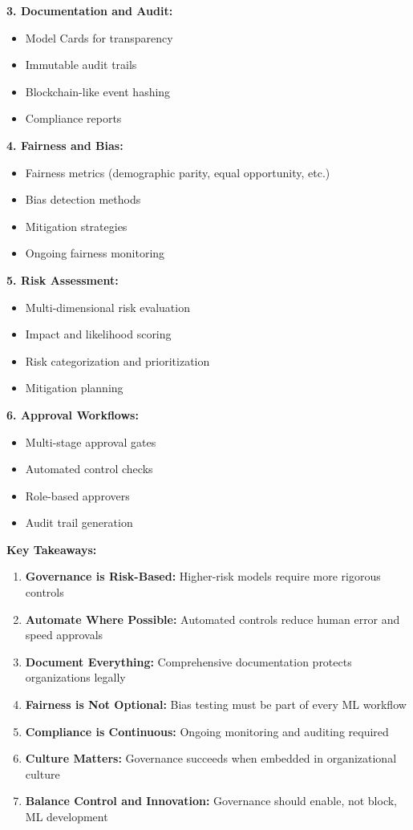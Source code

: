 \textbf{3. Documentation and Audit:}
\begin{itemize}
    \item Model Cards for transparency
    \item Immutable audit trails
    \item Blockchain-like event hashing
    \item Compliance reports
\end{itemize}

\textbf{4. Fairness and Bias:}
\begin{itemize}
    \item Fairness metrics (demographic parity, equal opportunity, etc.)
    \item Bias detection methods
    \item Mitigation strategies
    \item Ongoing fairness monitoring
\end{itemize}

\textbf{5. Risk Assessment:}
\begin{itemize}
    \item Multi-dimensional risk evaluation
    \item Impact and likelihood scoring
    \item Risk categorization and prioritization
    \item Mitigation planning
\end{itemize}

\textbf{6. Approval Workflows:}
\begin{itemize}
    \item Multi-stage approval gates
    \item Automated control checks
    \item Role-based approvers
    \item Audit trail generation
\end{itemize}

\textbf{Key Takeaways:}

\begin{enumerate}
    \item \textbf{Governance is Risk-Based:} Higher-risk models require more rigorous controls
    \item \textbf{Automate Where Possible:} Automated controls reduce human error and speed approvals
    \item \textbf{Document Everything:} Comprehensive documentation protects organizations legally
    \item \textbf{Fairness is Not Optional:} Bias testing must be part of every ML workflow
    \item \textbf{Compliance is Continuous:} Ongoing monitoring and auditing required
    \item \textbf{Culture Matters:} Governance succeeds when embedded in organizational culture
    \item \textbf{Balance Control and Innovation:} Governance should enable, not block, ML development
\end{enumerate}

